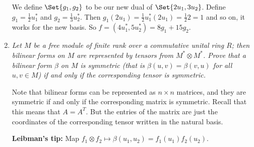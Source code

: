 \documentclass[9pt,reqno,twoside]{amsbook}
\theoremstyle{plain}
\numberwithin{section}{chapter}
\numberwithin{equation}{chapter}
\theoremstyle{definition}
\theoremstyle{remark}
\theoremstyle{plain}
\newcommand{\bb}{\vspace{3mm}}
\newcommand{\fracc}{\frac}
\newcommand{\tens}{\otimes}
\begin{document}
\begin{enumerate}[label=\arabic*.]
\bb
We define $\Set{g_1,g_2}$ to be our new dual of $\Set{2u_1,3u_2}$. Define $g_1 =  \fracc{1}{2}u_1^*$ and $g_2 = \fracc{1}{3}u_2^*$. Then $g_1(2u_1) = \fracc{1}{2}u_1^*(2u_1) = \fracc{1}{2}2 = 1$ and so on, it works for the new basis. So $f = (4u_1^*,5u_2^*) = 8g_1+15g_2$. 

\bb

\item \textit{Let $M$ be a free module of finite rank over a commutative unital ring $R$; then bilinear forms on $M$ are represented by tensors from $M^* \tens M^*$. Prove that a bilinear form $\beta$ on $M$ is symmetric (that is $\beta(u,v) = \beta(v,u)$ for all $u,v \in M$) if and only if the corresponding tensor is symmetric. }

Note that bilinear forms can be represented as $n \times n$ matrices, and they are symmetric if and only if the corresponding matrix is symmetric. Recall that this means that $A = A^T$. But the entries of the matrix are just the coordinates of the corresponding tensor written in the natural basis. 


\textbf{Leibman's tip: }Map $f_1 \tens f_2\mapsto \beta(u_{1},u_{2})=f_{1}(u_{1})f_{2}(u_{2})$. 




















\begin{comment}
\begin{proof}
We are given that $Hom(M \times M,R) \cong M^* \tens M^*$, and it can be easily checked that $\gamma(u,v) \mapsto \gamma(u,0) \tens \gamma(0,v)$ is an isomorphism using the universal property. So suppose $\gamma$ is symmetric. Then we have $\gamma(u,v) = \gamma(v,u)$ which gives us:
$$
\gamma(u,0) \tens \gamma(0,v) = \gamma(0,u) \tens \gamma(v,0),
$$
and so the image tensor is symmetric by definition. And by the exact same reasoning, we know that any tensor $\alpha(u) \tens \beta(v) \in M^* \tens M^*$ has a corresponding $\gamma(u,v)$ in $Hom(M \times M,R)$ s.t. $\gamma(u,0) = \alpha(u)$ and $\gamma(0,v) = \beta(v)$ by surjectivity of our isomorphism. Then we know if $\alpha(u) \tens \beta(v) = \beta(u) \tens \alpha(v)$ then 
$$
\gamma(u,0) \tens \gamma(0,v) = \alpha(u) \tens \beta(v) = \beta(u) \tens \alpha(v) = \gamma(0,u) \tens \gamma(v,0),
$$
and then by injectivity of our isomorphism, we have $\gamma(u,v) = \gamma(v,u)$. 
\end{proof}


\end{comment}
\end{enumerate}
\end{document}
